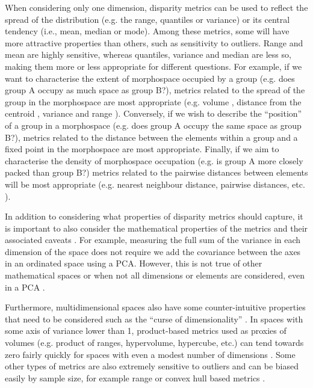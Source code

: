 \documentclass[12pt,letterpaper]{article}
\begin{document}
When considering only one dimension, disparity metrics can be used to reflect the spread of the distribution (e.g. the range, quantiles or variance) or its central tendency (i.e., mean, median or mode).
Among these metrics, some will have more attractive properties than others, such as sensitivity to outliers. Range and mean are highly sensitive, whereas quantiles, variance and median are less so, making them more or less appropriate for different questions.
For example, if we want to characterise the extent of morphospace occupied by a group (e.g. does group A occupy as much space as group B?), metrics related to the spread of the group in the morphospace are most appropriate (e.g. volume
\citealt{Diaz2016-mr}, distance from the centroid \citealt{Hopkins2017-cf, Finlay2015-ft}, variance and range \citealt{Brusatte2008-fx}).
Conversely, if we wish to describe the ``position''
 of a group in a morphospace (e.g. does group A occupy the same space as group B?), metrics related to the distance between the elements within a group and a fixed point in the morphospace are most appropriate. %
Finally, if we aim to characterise the density of morphospace occupation (e.g. is group A more closely packed than group B?) metrics related to the pairwise distances between elements will be most appropriate (e.g. nearest neighbour distance, pairwise distances, etc. \citealt{Close2015-qi}).

In addition to considering what properties of disparity metrics should capture, it is important to also consider the mathematical properties of the metrics and their associated caveats \citep{Wills2001-wh, Ciampaglio2001-iz}.
For example, measuring the full sum of the variance in each dimension of the space does not require we add the covariance between the axes in an ordinated space using a PCA.
However, this is not true of other mathematical spaces or when not all dimensions or elements are considered, even in a PCA \citep{Legendre2012-va}.

Furthermore, multidimensional spaces also have some counter-intuitive properties that need to be considered such as the ``curse of dimensionality'' \citep{Bellman1966-mc}.
In spaces with some axis of variance lower than 1, product-based metrics used as proxies of volumes (e.g. product of ranges, hypervolume, hypercube, etc.) can tend towards zero fairly quickly for spaces with even a modest number of dimensions \citep{Bellman1966-mc}. %
Some other types of metrics are also extremely sensitive to outliers and can be biased easily by sample size, for example range \citep{Butler2012-tr}
or convex hull based metrics \citep{Butler2012-tr, Jackson2011-kq}.
\end{document}
